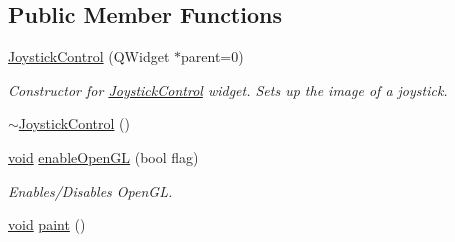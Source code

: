 \subsection*{\-Public \-Member \-Functions}
\begin{DoxyCompactItemize}
\item 
\hyperlink{group___g_c_s_control_gadget_plugin_ga77373f65ad7f3da249f63ebd5d64a736}{\-Joystick\-Control} (\-Q\-Widget $\ast$parent=0)
\begin{DoxyCompactList}\small\item\em \-Constructor for \hyperlink{class_joystick_control}{\-Joystick\-Control} widget. \-Sets up the image of a joystick. \end{DoxyCompactList}\item 
\hyperlink{group___g_c_s_control_gadget_plugin_gafb2a1d3ac608e7378bba52d774b825d0}{$\sim$\-Joystick\-Control} ()
\item 
\hyperlink{group___u_a_v_objects_plugin_ga444cf2ff3f0ecbe028adce838d373f5c}{void} \hyperlink{group___g_c_s_control_gadget_plugin_ga4737e633732c138c5ad259f7fe0a0e04}{enable\-Open\-G\-L} (bool flag)
\begin{DoxyCompactList}\small\item\em \-Enables/\-Disables \-Open\-G\-L. \end{DoxyCompactList}\item 
\hyperlink{group___u_a_v_objects_plugin_ga444cf2ff3f0ecbe028adce838d373f5c}{void} \hyperlink{group___g_c_s_control_gadget_plugin_gaf79331833d41cf9af3b151a0f18663e0}{paint} ()
\end{DoxyCompactItemize}
